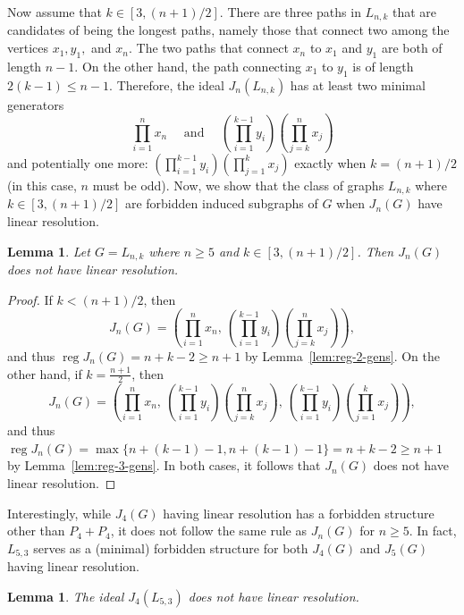 \documentclass{amsart}
\newtheorem{lemma}[theorem]{Lemma}
\theoremstyle{remark}
\theoremstyle{definition}
\DeclareMathOperator{\reg}{reg}
\begin{document}
    Now assume that $k\in [3,(n+1)/2]$. There are three paths in $L_{n,k}$ that are candidates of being the longest paths, namely those that connect two among the vertices $x_1, y_1,$ and $x_n$. The two paths that connect $x_n$ to $x_1$ and $y_1$ are both of length $n-1$. On the other hand, the path connecting $x_1$ to $y_1$ is of length $2(k-1)\leq n-1$. Therefore, the ideal $J_n(L_{n,k})$ has at least two minimal generators
    \[
    \prod_{i=1}^n x_n\quad \text{ and }\quad \left(\prod_{i=1}^{k-1} y_i\right)\left( \prod_{j=k}^n x_j\right)
    \]
    and potentially one more: $\left(\prod_{i=1}^{k-1} y_i\right)\left( \prod_{j=1}^k x_j\right)$ exactly when $k=(n+1)/2$ (in this case, $n$ must be odd). Now, we show that the class of graphs $L_{n,k}$ where $ k\in [3,(n+1)/2]$ are forbidden induced subgraphs of $G$ when $J_n(G)$ have linear resolution.
	
	
	
	
	
	\begin{lemma}\label{lem:forbidden-structures}
		Let $G=L_{n,k}$ where $n\geq 5$  and $k\in [3,(n+1)/2]$. Then $J_n(G)$ does not have linear resolution.
	\end{lemma}
	\begin{proof}
		If $k<(n+1)/2$, then 
        \[
        J_n(G)=\left(\prod_{i=1}^n x_n,\  \left(\prod_{i=1}^{k-1} y_i\right)\left( \prod_{j=k}^n x_j\right)\right),
        \]
        and thus $\reg J_n(G) = n+k-2 \geq n+1$ by Lemma~\ref{lem:reg-2-gens}. On the other hand, if $k=\frac{n+1}{2}$, then
        \[
        J_n(G)=\left(\prod_{i=1}^n x_n,\  \left(\prod_{i=1}^{k-1} y_i\right)\left( \prod_{j=k}^n x_j\right), \ \left(\prod_{i=1}^{k-1} y_i\right)\left( \prod_{j=1}^k x_j\right)\right),
        \]
        and thus $\reg J_n(G) = \max\{ n+(k-1)-1, n+(k-1)-1 \} = n+k-2 \geq n+1$ by Lemma~\ref{lem:reg-3-gens}. In both cases, it follows that $J_n(G)$ does not have linear resolution.
	\end{proof} 
    Interestingly, while $J_4(G)$ having linear resolution has a forbidden structure other than $P_4+P_4$, it does not follow the same rule as $J_n(G)$ for $n\geq 5$. In fact, $L_{5,3}$ serves as a (minimal) forbidden structure for both $J_4(G)$ and $J_5(G)$ having linear resolution.

	
	\begin{lemma}\label{lem:forbidden-for-J4}
		The ideal $J_4(L_{5,3})$ does not have linear resolution. 
	\end{lemma}
	
\end{document}

